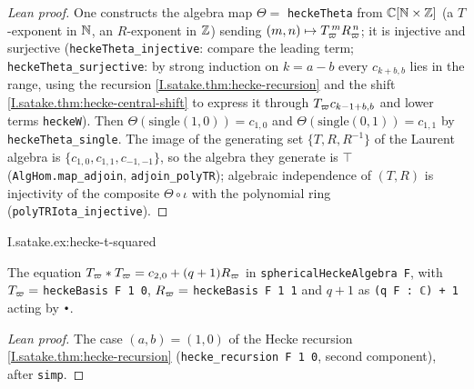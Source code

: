 \begin{proof}[Lean proof]
One constructs the algebra map $\Theta=$ \texttt{heckeTheta} from $\mathbb{C}[\mathbb{N}\times\mathbb{Z}]$ (a $T$-exponent in $\mathbb{N}$, an $R$-exponent in $\mathbb{Z}$) sending $(m,n)\mapsto T_\varpi^{\,m}R_\varpi^{\,n}$; it is injective and surjective (\texttt{heckeTheta\_injective}: compare the leading term; \texttt{heckeTheta\_surjective}: by strong induction on $k=a-b$ every $c_{k+b,b}$ lies in the range, using the recursion \cref{I.satake.thm:hecke-recursion} and the shift \cref{I.satake.thm:hecke-central-shift} to express it through $T_\varpi c_{k-1+b,b}$ and lower terms \texttt{heckeW}). Then $\Theta(\mathrm{single}(1,0))=c_{1,0}$ and $\Theta(\mathrm{single}(0,1))=c_{1,1}$ by \texttt{heckeTheta\_single}. The image of the generating set $\{T,R,R^{-1}\}$ of the Laurent algebra is $\{c_{1,0},c_{1,1},c_{-1,-1}\}$, so the algebra they generate is $\top$ (\texttt{AlgHom.map\_adjoin}, \texttt{adjoin\_polyTR}); algebraic independence of $(T,R)$ is injectivity of the composite $\Theta\circ\iota$ with the polynomial ring (\texttt{polyTRIota\_injective}).
\end{proof}

\begin{example}
\end{example}
\begin{tfformal}{I.satake.ex:hecke-t-squared}
\begin{tffidelity}
The equation $T_\varpi*T_\varpi=c_{2,0}+(q+1)R_\varpi$ in \texttt{sphericalHeckeAlgebra F}, with $T_\varpi=$ \texttt{heckeBasis F 1 0}, $R_\varpi=$ \texttt{heckeBasis F 1 1} and $q+1$ as \texttt{(q F : ℂ) + 1} acting by \texttt{•}.
\end{tffidelity}
\end{tfformal}
\begin{proof}[Lean proof]
The case $(a,b)=(1,0)$ of the Hecke recursion \cref{I.satake.thm:hecke-recursion} (\texttt{hecke\_recursion F 1 0}, second component), after \texttt{simp}.
\end{proof}

